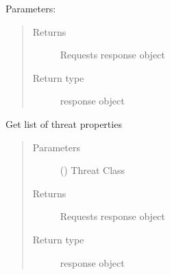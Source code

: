 \documentclass[letterpaper,10pt,english]{sphinxmanual}
\begin{document}
\begin{fulllineitems}
\begin{fulllineitems}
\sphinxAtStartPar
Parameters:
\begin{quote}\begin{description}
\item[{Returns}] \leavevmode
\sphinxAtStartPar
Requests response object

\item[{Return type}] \leavevmode
\sphinxAtStartPar
response object

\end{description}\end{quote}

\end{fulllineitems}


\begin{fulllineitems}
\label{\detokenize{b1td-class:bloxone.b1td.threat_properties}}
\sphinxAtStartPar
Get list of threat properties
\begin{quote}\begin{description}
\item[{Parameters}] \leavevmode
\sphinxAtStartPar
{} () \textendash{} Threat Class

\item[{Returns}] \leavevmode
\sphinxAtStartPar
Requests response object

\item[{Return type}] \leavevmode
\sphinxAtStartPar
response object

\end{description}\end{quote}

\end{fulllineitems}



\end{fulllineitems}
\end{document}

